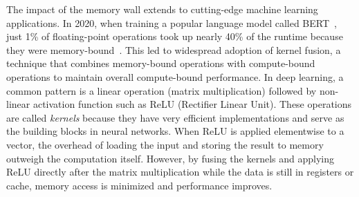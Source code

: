 The impact of the memory wall extends to cutting-edge machine learning applications. In 2020, when training a popular language model called BERT~\cite{Devlin_2018_BERT_Pre_train}, just 1\% of floating-point operations took up nearly 40\% of the runtime because they were memory-bound~\cite{Ivanov_2020_Data_Movement_I}. This led to widespread adoption of kernel fusion, a technique that combines memory-bound operations with compute-bound operations to maintain overall compute-bound performance. In deep learning, a common pattern is a linear operation (matrix multiplication) followed by non-linear activation function such as ReLU (Rectifier Linear Unit). These operations are called \emph{kernels} because they have very efficient implementations and serve as the building blocks in neural networks. When ReLU is applied elementwise to a vector, the overhead of loading the input and storing the result to memory outweigh the computation itself. However, by fusing the kernels and applying ReLU directly after the matrix multiplication while the data is still in registers or cache, memory access is minimized and performance improves.

